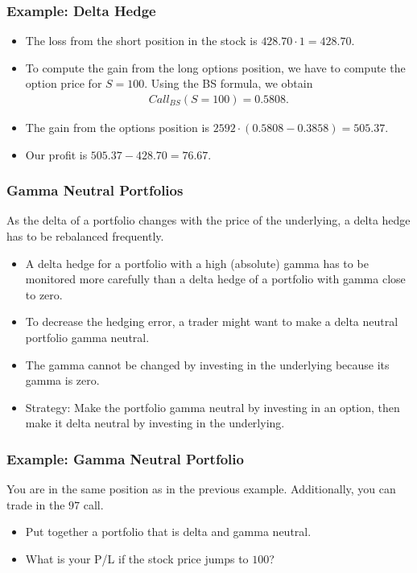 \begin{frame}[fragile]
\frametitle{Example: Delta Hedge}
\begin{itemize}
  \item The loss from the short position in the stock is $428.70 \cdot
  1=428.70$.
  \item To compute the gain from the long options position, we have to compute
  the option price for $S=100$. Using the BS formula, we obtain
  \begin{align*}
    Call_{BS}(S=100) = 0.5808.
  \end{align*}
  \item The gain from the options position is $2592\cdot(0.5808-0.3858)=505.37$.
  \item Our profit is $505.37-428.70=76.67$.
\end{itemize}
\end{frame}


\begin{frame}[fragile]
\frametitle{Gamma Neutral Portfolios}
As the delta of a portfolio changes with the price of the underlying, a delta
hedge has to be rebalanced frequently. 
\begin{itemize}
  \item A delta hedge for a portfolio with a high (absolute) gamma has to be
  monitored more carefully than a delta hedge of a portfolio with gamma close to
  zero.
  \item To decrease the hedging error, a trader might want to make a delta
  neutral portfolio gamma neutral.
  \item The gamma cannot be changed by investing in the underlying because its
  gamma is zero.
  \item Strategy: Make the portfolio gamma neutral by investing in an option,
  then make it delta neutral by investing in the underlying.
\end{itemize}
\end{frame}



\begin{frame}[fragile]
\frametitle{Example: Gamma Neutral Portfolio}
You are in the same position as in the previous example. Additionally, you can
trade in the $97$ call. 
\begin{itemize}
  \item Put together a portfolio that is delta and gamma neutral.
  \item What is your P/L if the stock price jumps to $100$?
\end{itemize}
\end{frame}

